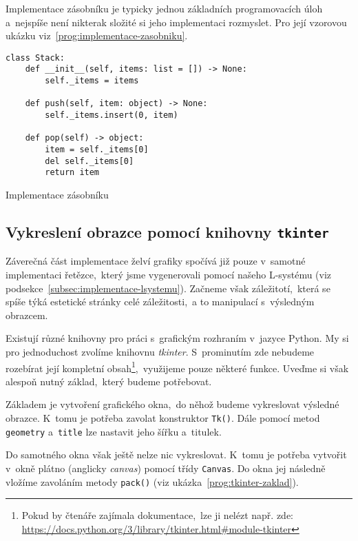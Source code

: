 Implementace zásobníku je typicky jednou základních programovacích úloh a~nejspíše není nikterak složité si jeho implementaci rozmyslet. Pro její vzorovou ukázku viz~\ref{prog:implementace-zasobniku}.
\begin{program}[h]
\begin{lstlisting}[style=python]
class Stack:
    def __init__(self, items: list = []) -> None:
        self._items = items

    def push(self, item: object) -> None:
        self._items.insert(0, item)
    
    def pop(self) -> object:
        item = self._items[0]
        del self._items[0]
        return item  
\end{lstlisting}
    \caption{Implementace zásobníku}
    \label{prog:implementace-zasobniku}
\end{program}

\subsection{Vykreslení obrazce pomocí knihovny \texttt{tkinter}}\label{subsec:vykresleni-obrazce}

Záverečná část implementace želví grafiky spočívá již pouze v~samotné implementaci řetězce,~který jsme vygenerovali pomocí našeho L-systému (viz podsekce~\ref{subsec:implementace-lsystemu}). Začneme však záležitotí,~která se spíše týká estetické stránky celé záležitosti,~a to manipulací s~výsledným obrazcem.

Existují různé knihovny pro práci s~grafickým rozhraním v~jazyce Python. My si pro jednoduchost zvolíme knihovnu \emph{tkinter}. S~prominutím zde nebudeme rozebírat její kompletní obsah\footnote{Pokud by čtenáře zajímala dokumentace,~lze ji nelézt např. zde: \url{https://docs.python.org/3/library/tkinter.html\#module-tkinter}},~využijeme pouze některé funkce. Uveďme si však alespoň nutný základ,~který budeme potřebovat.

Základem je vytvoření grafického okna,~do něhož budeme vykreslovat výsledné obrazce. K~tomu je potřeba zavolat konstruktor \texttt{Tk()}. Dále pomocí metod \texttt{geometry} a~\texttt{title} lze nastavit jeho šířku a~titulek.

Do samotného okna však ještě nelze nic vykreslovat. K~tomu je potřeba vytvořit v~okně plátno (anglicky \emph{canvas}) pomocí třídy \texttt{Canvas}. Do okna jej následně vložíme zavoláním metody \texttt{pack()} (viz ukázka~\ref{prog:tkinter-zaklad}).


